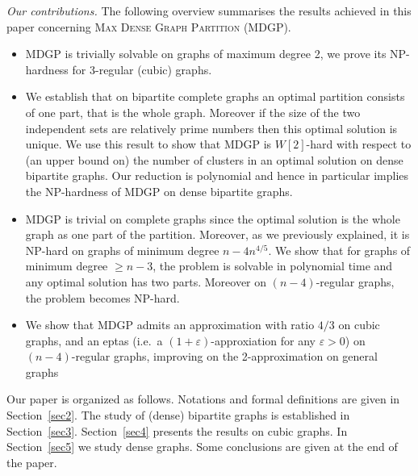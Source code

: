 \documentclass[a4paper,USenglish,cleveref, autoref]{lipics-v2021}
\newcommand\MDGP{\textsc{Max Dense Graph Partition}}
\begin{document}
\medskip
\noindent
\emph{Our contributions.}  The following overview summarises the results achieved in this paper concerning \MDGP{} (MDGP). 
\begin{itemize}
\item MDGP is trivially solvable on graphs of maximum degree 2, we prove its NP-hardness for 3-regular (cubic) graphs. 

\item We establish that on bipartite complete graphs an optimal partition  consists of one part, that is the whole graph. Moreover if the size of the two independent sets are relatively prime numbers then this optimal solution is unique. We use this result to show that MDGP is $W[2]$-hard with respect to (an upper bound on) the number of clusters in an optimal solution on dense bipartite graphs. Our reduction is polynomial and hence in particular implies the NP-hardness of MDGP on dense bipartite graphs.

\item MDGP is trivial on complete graphs since the optimal solution is the whole graph as one part of the partition. Moreover, as we previously explained, it is NP-hard on graphs of minimum degree $n-4n^{4/5}$.  We show that for graphs of minimum degree $\geq n-3$, the problem is solvable in polynomial time and any optimal solution has two parts.  Moreover on $(n-4)$-regular graphs, the problem becomes NP-hard. 

\item We show that MDGP admits an approximation with ratio $4/3$ on cubic graphs, and an eptas (i.e.~a $(1+\varepsilon)$-approxiation for any $\varepsilon >0$) on $(n-4)$-regular graphs, improving on the 2-approximation on general graphs~\cite{bib:density:aziz2015welfare}
\end{itemize}

Our paper is organized as follows. Notations and  formal definitions are given in
Section~\ref{sec2}. The study of (dense) bipartite graphs is established in Section~\ref{sec3}. Section~\ref{sec4} presents the results on cubic graphs. In Section~\ref{sec5} we study
dense graphs. %
 Some conclusions are given at the end of the paper.
\end{document}
